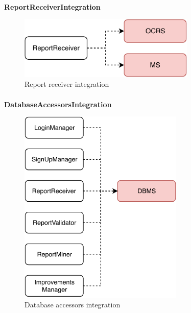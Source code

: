 			\paragraph{}
				\textbf{ReportReceiverIntegration}
					\begin{figure}[!h]
						\centering
						\includegraphics[width=0.75\textwidth]{images/Integration/ReportReceiverIntegration.pdf}
						\caption{Report receiver integration}
					\end{figure}
			\clearpage
			\paragraph{}
				\textbf{DatabaseAccessorsIntegration}
			
					\begin{figure}[!h]
						\centering
						\includegraphics[width=0.7\textwidth]{images/Integration/DatabaseAccessorsIntegration.pdf}
						\caption{Database accessors integration}
					\end{figure}
